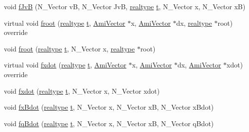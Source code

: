 \begin{DoxyCompactItemize}
\item 
void \mbox{\hyperlink{classamici_1_1_model___o_d_e_af9c1f29040dc3c6c8bca0703676843be}{f\+JvB}} (N\+\_\+\+Vector vB, N\+\_\+\+Vector JvB, \mbox{\hyperlink{namespaceamici_a1bdce28051d6a53868f7ccbf5f2c14a3}{realtype}} \mbox{\hyperlink{classamici_1_1_model_a711281d57e9710226face29151cc4641}{t}}, N\+\_\+\+Vector x, N\+\_\+\+Vector xB)
\item 
virtual void \mbox{\hyperlink{classamici_1_1_model___o_d_e_a94a623b51fd0ecd7a9a549eb7da2fc04}{froot}} (\mbox{\hyperlink{namespaceamici_a1bdce28051d6a53868f7ccbf5f2c14a3}{realtype}} \mbox{\hyperlink{classamici_1_1_model_a711281d57e9710226face29151cc4641}{t}}, \mbox{\hyperlink{classamici_1_1_ami_vector}{Ami\+Vector}} $\ast$x, \mbox{\hyperlink{classamici_1_1_ami_vector}{Ami\+Vector}} $\ast$dx, \mbox{\hyperlink{namespaceamici_a1bdce28051d6a53868f7ccbf5f2c14a3}{realtype}} $\ast$root) override
\item 
void \mbox{\hyperlink{classamici_1_1_model___o_d_e_ab76d051378cedaaeffa04f18c00e79cb}{froot}} (\mbox{\hyperlink{namespaceamici_a1bdce28051d6a53868f7ccbf5f2c14a3}{realtype}} \mbox{\hyperlink{classamici_1_1_model_a711281d57e9710226face29151cc4641}{t}}, N\+\_\+\+Vector x, \mbox{\hyperlink{namespaceamici_a1bdce28051d6a53868f7ccbf5f2c14a3}{realtype}} $\ast$root)
\item 
virtual void \mbox{\hyperlink{classamici_1_1_model___o_d_e_a33461bc9bc047e838607d958eb29621a}{fxdot}} (\mbox{\hyperlink{namespaceamici_a1bdce28051d6a53868f7ccbf5f2c14a3}{realtype}} \mbox{\hyperlink{classamici_1_1_model_a711281d57e9710226face29151cc4641}{t}}, \mbox{\hyperlink{classamici_1_1_ami_vector}{Ami\+Vector}} $\ast$x, \mbox{\hyperlink{classamici_1_1_ami_vector}{Ami\+Vector}} $\ast$dx, \mbox{\hyperlink{classamici_1_1_ami_vector}{Ami\+Vector}} $\ast$xdot) override
\item 
void \mbox{\hyperlink{classamici_1_1_model___o_d_e_aa08f195ec3f1e9ec3d208abfbf27b23a}{fxdot}} (\mbox{\hyperlink{namespaceamici_a1bdce28051d6a53868f7ccbf5f2c14a3}{realtype}} \mbox{\hyperlink{classamici_1_1_model_a711281d57e9710226face29151cc4641}{t}}, N\+\_\+\+Vector x, N\+\_\+\+Vector xdot)
\item 
void \mbox{\hyperlink{classamici_1_1_model___o_d_e_a433a0e1e4330ef433823a61f1fc45a5a}{fx\+Bdot}} (\mbox{\hyperlink{namespaceamici_a1bdce28051d6a53868f7ccbf5f2c14a3}{realtype}} \mbox{\hyperlink{classamici_1_1_model_a711281d57e9710226face29151cc4641}{t}}, N\+\_\+\+Vector x, N\+\_\+\+Vector xB, N\+\_\+\+Vector x\+Bdot)
\item 
void \mbox{\hyperlink{classamici_1_1_model___o_d_e_a9d0e4612af8d7b3c418d000b5e9ba84f}{fq\+Bdot}} (\mbox{\hyperlink{namespaceamici_a1bdce28051d6a53868f7ccbf5f2c14a3}{realtype}} \mbox{\hyperlink{classamici_1_1_model_a711281d57e9710226face29151cc4641}{t}}, N\+\_\+\+Vector x, N\+\_\+\+Vector xB, N\+\_\+\+Vector q\+Bdot)

\end{DoxyCompactItemize}
